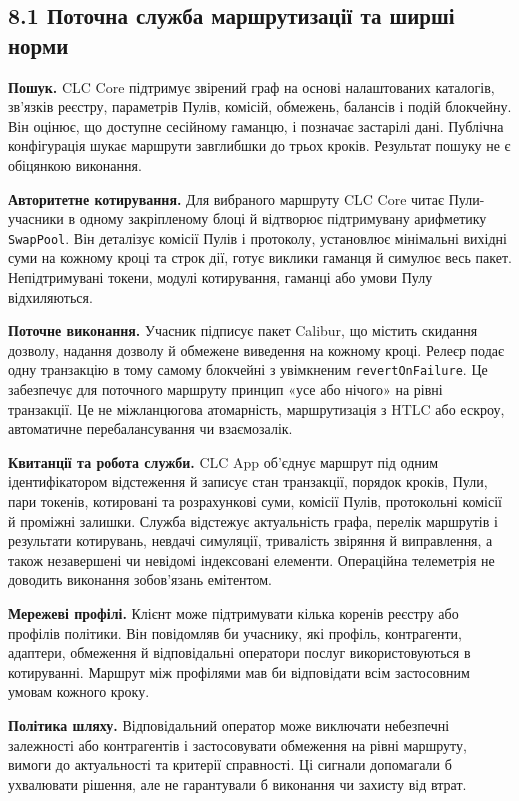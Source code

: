 \documentclass[11pt]{article}
\begin{document}
\subsection*{8.1 Поточна служба маршрутизації та ширші норми}

\textbf{Пошук.} CLC Core підтримує звірений граф на основі налаштованих каталогів, зв'язків реєстру, параметрів Пулів, комісій, обмежень, балансів і подій блокчейну. Він оцінює, що доступне сесійному гаманцю, і позначає застарілі дані. Публічна конфігурація шукає маршрути завглибшки до трьох кроків. Результат пошуку не є обіцянкою виконання.

\textbf{Авторитетне котирування.} Для вибраного маршруту CLC Core читає Пули-учасники в одному закріпленому блоці й відтворює підтримувану арифметику \texttt{SwapPool}. Він деталізує комісії Пулів і протоколу, установлює мінімальні вихідні суми на кожному кроці та строк дії, готує виклики гаманця й симулює весь пакет. Непідтримувані токени, модулі котирування, гаманці або умови Пулу відхиляються.

\textbf{Поточне виконання.} Учасник підписує пакет Calibur, що містить скидання дозволу, надання дозволу й обмежене виведення на кожному кроці. Релеєр подає одну транзакцію в тому самому блокчейні з увімкненим \texttt{revertOnFailure}. Це забезпечує для поточного маршруту принцип «усе або нічого» на рівні транзакції. Це не міжланцюгова атомарність, маршрутизація з HTLC або ескроу, автоматичне перебалансування чи взаємозалік.

\textbf{Квитанції та робота служби.} CLC App об'єднує маршрут під одним ідентифікатором відстеження й записує стан транзакції, порядок кроків, Пули, пари токенів, котировані та розрахункові суми, комісії Пулів, протокольні комісії й проміжні залишки. Служба відстежує актуальність графа, перелік маршрутів і результати котирувань, невдачі симуляції, тривалість звіряння й виправлення, а також незавершені чи невідомі індексовані елементи. Операційна телеметрія не доводить виконання зобов'язань емітентом.

\textbf{Мережеві профілі.} Клієнт може підтримувати кілька коренів реєстру або профілів політики. Він повідомляв би учаснику, які профіль, контрагенти, адаптери, обмеження й відповідальні оператори послуг використовуються в котируванні. Маршрут між профілями мав би відповідати всім застосовним умовам кожного кроку.

\textbf{Політика шляху.} Відповідальний оператор може виключати небезпечні залежності або контрагентів і застосовувати обмеження на рівні маршруту, вимоги до актуальності та критерії справності. Ці сигнали допомагали б ухвалювати рішення, але не гарантували б виконання чи захисту від втрат.
\end{document}
